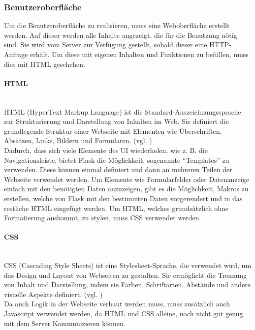 \subsubsection{Benutzeroberfläche}

Um die Benutzeroberfläche zu realisieren, muss eine Weboberfläche erstellt werden. Auf dieser werden alle Inhalte angezeigt, die für die Benutzung nötig sind. Sie wird vom Server zur Verfügung gestellt, sobald dieser eine HTTP-Anfrage erhält. Um diese mit eigenen Inhalten und Funktionen zu befüllen, muss dies mit HTML geschehen.

\paragraph{HTML}\mbox{}\\
HTML (HyperText Markup Language) ist die Standard-Auszeichnungssprache zur Strukturierung und Darstellung von Inhalten im Web. Sie definiert die grundlegende Struktur einer Webseite mit Elementen wie Überschriften, Absätzen, Links, Bildern und Formularen. (vgl. \cite{gpt_html})\\

Dadurch, dass sich viele Elemente des UI wiederholen, wie z. B. die Navigationsleiste, bietet Flask die Möglichkeit, sogenannte \enquote{Templates} zu verwenden. Diese können einmal definiert und dann an mehreren Teilen der Webseite verwendet werden.
Um Elemente wie Formularfelder oder Datenanzeige einfach mit den benötigten Daten anzuzeigen, gibt es die Möglichkeit, Makros zu erstellen, welche von Flask mit den bestimmten Daten vorgerendert und in das restliche HTML eingefügt werden.
Um HTML, welches grundsätzlich ohne Formatierung auskommt, zu stylen, muss CSS verwendet werden.

\paragraph{CSS}\mbox{}\\
CSS (Cascading Style Sheets) ist eine Stylesheet-Sprache, die verwendet wird, um das Design und Layout von Webseiten zu gestalten. Sie ermöglicht die Trennung von Inhalt und Darstellung, indem sie Farben, Schriftarten, Abstände und andere visuelle Aspekte definiert. (vgl. \cite{gpt_css})\\

Da auch Logik in der Webseite verbaut werden muss, muss zusätzlich auch Javascript verwendet werden, da HTML und CSS alleine, noch nicht gut genug mit dem Server Kommunizieren können.

